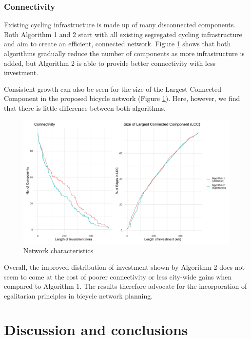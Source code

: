 \documentclass[
]{article}
\begin{document}
\hypertarget{connectivity}{%
\subsubsection{Connectivity}\label{connectivity}}

Existing cycling infrastructure is made up of many disconnected components.
Both Algorithm 1 and 2 start with all existing segregated cycling infrastructure and aim to create an efficient, connected network.
Figure \ref{fig:componentsandGCC} shows that both algorithms gradually reduce the number of components as more infrastructure is added, but Algorithm 2 is able to provide better connectivity with less investment.

Consistent growth can also be seen for the size of the Largest Connected Component in the proposed bicycle network (Figure \ref{fig:componentsandGCC}).
Here, however, we find that there is little difference between both algorithms.

\begin{figure}[H]

{\centering \includegraphics[width=0.85\linewidth]{data/Manchester/Plots/Growth_Results/growth_util_egal_components_gcc_components_together_Manchester} 

}

\caption{Network characteristics}\label{fig:componentsandGCC}
\end{figure}

Overall, the improved distribution of investment shown by Algorithm 2 does not seem to come at the cost of poorer connectivity or less city-wide gains when compared to Algorithm 1.
The results therefore advocate for the incorporation of egalitarian principles in bicycle network planning.

\hypertarget{discussion-and-conclusions}{%
\section{Discussion and conclusions}\label{discussion-and-conclusions}}
\end{document}
